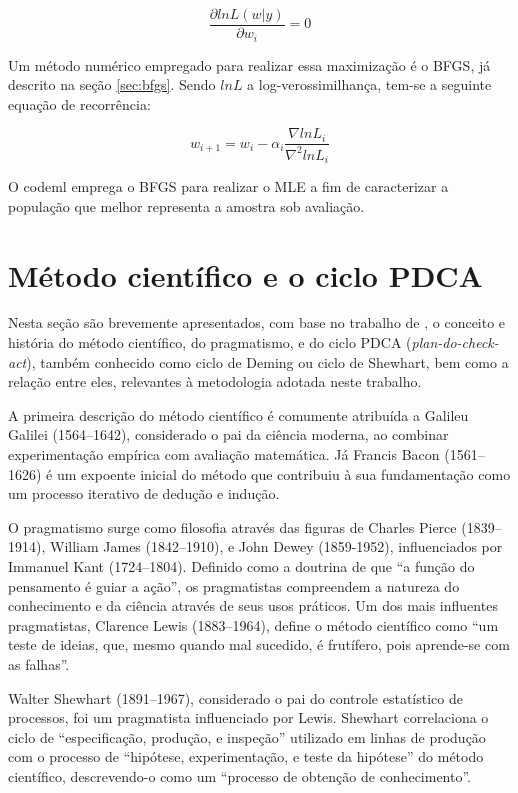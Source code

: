 \documentclass[cic,tc]{iiufrgs}
\begin{document}
$$ \frac{\partial ln L(w|y)}{\partial w_i} = 0 $$


Um método numérico empregado para realizar essa maximização é o BFGS, já
descrito na seção \ref{sec:bfgs}. Sendo $lnL$ a log-verossimilhança, tem-se a
seguinte equação de recorrência:

$$ w_{i+1} = w_i - \alpha_i \frac{\nabla lnL_i}{\nabla^2 lnL_i} $$

O codeml emprega o BFGS para realizar o MLE a fim de caracterizar a população
que melhor representa a amostra sob avaliação.


\section{Método científico e o ciclo PDCA}
\label{sec:pdca}

Nesta seção são brevemente apresentados, com base no trabalho de
\cite{moen2006evolution}, o conceito e história do método científico, do
pragmatismo, e do ciclo PDCA (\textit{plan-do-check-act}), também conhecido
como ciclo de Deming ou ciclo de Shewhart, bem como a relação entre eles,
relevantes à metodologia adotada neste trabalho.

A primeira descrição do método científico é comumente atribuída a Galileu
Galilei (1564--1642), considerado o pai da ciência moderna, ao combinar
experimentação empírica com avaliação matemática. Já Francis Bacon (1561--1626)
é um expoente inicial do método que contribuiu à sua fundamentação como um
processo iterativo de dedução e indução.

O pragmatismo surge como filosofia através das figuras de Charles Pierce
(1839--1914), William James (1842--1910), e John Dewey (1859-1952),
influenciados por Immanuel Kant (1724--1804). Definido como a doutrina de que
``a função do pensamento é guiar a ação'', os pragmatistas compreendem a
natureza do conhecimento e da ciência através de seus usos práticos. Um dos
mais influentes pragmatistas, Clarence Lewis (1883--1964), define o método
científico como ``um teste de ideias, que, mesmo quando mal sucedido, é
frutífero, pois aprende-se com as falhas''. 

Walter Shewhart (1891--1967), considerado o pai do controle estatístico de
processos, foi um pragmatista influenciado por Lewis. Shewhart correlaciona o
ciclo de ``especificação, produção, e inspeção'' utilizado em linhas de
produção com o processo de ``hipótese, experimentação, e teste da hipótese'' do
método científico, descrevendo-o como um ``processo de obtenção de
conhecimento''. 
\end{document}
